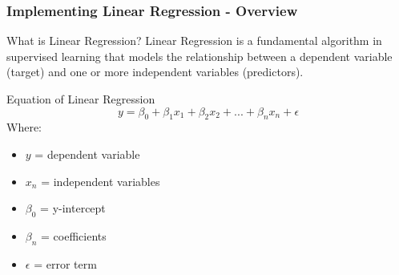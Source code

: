 \documentclass[aspectratio=169]{beamer}
\begin{document}
\begin{frame}[fragile]
    \frametitle{Implementing Linear Regression - Overview}
    \begin{block}{What is Linear Regression?}
        Linear Regression is a fundamental algorithm in supervised learning that models the relationship between a dependent variable (target) and one or more independent variables (predictors). 
    \end{block}
    
    \begin{block}{Equation of Linear Regression}
        \begin{equation}
            y = \beta_0 + \beta_1 x_1 + \beta_2 x_2 + ... + \beta_n x_n + \epsilon 
        \end{equation}
        Where:  
        \begin{itemize}
            \item \(y\) = dependent variable  
            \item \(x_n\) = independent variables  
            \item \(\beta_0\) = y-intercept  
            \item \(\beta_n\) = coefficients  
            \item \(\epsilon\) = error term  
        \end{itemize}
    \end{block}
\end{frame}
\end{document}
